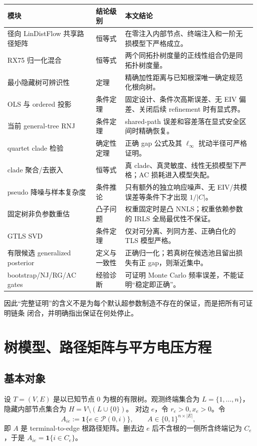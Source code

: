 \documentclass[UTF8,11pt]{ctexart}
\newcommand{\pathset}{\mathcal P}
\begin{document}
\begin{center}
\small
\begin{longtable}{p{4.2cm}p{3.0cm}p{7.0cm}}
\toprule
模块 & 结论级别 & 本文结论 \\
\midrule
径向 LinDistFlow 共享路径矩阵 & 恒等式 & 在零注入内部节点、终端注入和一阶无损模型下严格成立。\\
RX75 归一化混合 & 恒等式 & 两个同拓扑树度量的正线性组合仍是同拓扑树度量。\\
最小隐藏树可辨识性 & 定理 & 精确加性距离与已知根深唯一确定规范化根向树。\\
OLS 与 ordered 投影 & 条件定理 & 固定设计、条件次高斯误差、无 EIV 偏差、关闭后续 refinement 时有显式界。\\
当前 general-tree RNJ & 条件定理 & shared-path 误差和容差落在显式安全区间时精确恢复。\\
quartet clade 检验 & 确定性定理 & 正确 gap 公式及其 $\ell_\infty$ 扰动半径可严格证明。\\
clade 聚合/去嵌入 & 恒等式 & 真 clade、真灵敏度、线性无损模型下严格；AC 损耗进入模型失配。\\
pseudo 降噪与样本复杂度 & 条件推论 & 只有额外的独立响应噪声、无 EIV/共模误差等条件下才出现 $1/|C|$。\\
固定树非负参数重估 & 凸子问题 & 权重固定时是凸 NNLS；权重依赖参数的 IRLS 全局最优性不保证。\\
GTLS SVD & 条件定理 & 仅对可分离、列同方差、正确白化的 TLS 模型严格。\\
有限候选 generalized posterior & 定义与一致性 & 正确归一化；若真树在候选池且留出损失有正 gap，则渐近集中。\\
bootstrap/NJ/RG/AC gates & 经验诊断 & 可证明 Monte Carlo 频率误差，不能证明“稳定即正确”。\\
\bottomrule
\end{longtable}
\end{center}

因此“完整证明”的含义不是为每个默认超参数制造不存在的保证，而是把所有可证明链条
闭合，并明确指出保证在何处停止。

\section{树模型、路径矩阵与平方电压方程}

\subsection{基本对象}

设 $T=(V,E)$ 是以已知节点 $0$ 为根的有限树。观测终端集合为
$L=\{1,\ldots,n\}$，隐藏内部节点集合为 $H=V\setminus(L\cup\{0\})$。
对边 $e$，令 $r_e>0,x_e>0$。令
\begin{equation}
 A_{ie}:=\mathbf 1\{e\in\pathset(0,i)\},\qquad
 A\in\{0,1\}^{n\times |E|},
 \label{eq:path-incidence}
\end{equation}
即 $A$ 是 terminal-to-edge 根路径矩阵。删去边 $e$ 后不含根的一侧所含终端记为
$C_e$，于是 $A_{ie}=\mathbf 1\{i\in C_e\}$。
\end{document}
